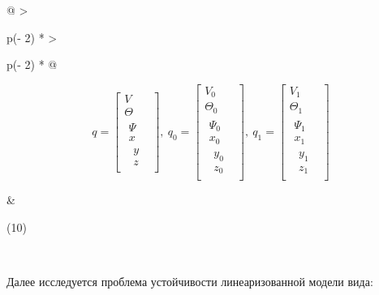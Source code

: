 \begin{longtable}[]{@{}
  >{\raggedright\arraybackslash}p{(\columnwidth - 2\tabcolsep) * }
  >{\raggedright\arraybackslash}p{(\columnwidth - 2\tabcolsep) * }@{}}
\toprule\noalign{}
\begin{minipage}[b]{\linewidth}\raggedright
\[q = \begin{bmatrix}
V \\
\Theta \\
\begin{matrix}
\Psi \\
x \\
\begin{matrix}
y \\
z
\end{matrix}
\end{matrix}
\end{bmatrix},\ q_{0} = \begin{bmatrix}
V_{0} \\
\Theta_{0} \\
\begin{matrix}
\Psi_{0} \\
x_{0} \\
\begin{matrix}
y_{0} \\
z_{0}
\end{matrix}
\end{matrix}
\end{bmatrix},\ q_{1} = \begin{bmatrix}
V_{1} \\
\Theta_{1} \\
\begin{matrix}
\Psi_{1} \\
x_{1} \\
\begin{matrix}
y_{1} \\
z_{1}
\end{matrix}
\end{matrix}
\end{bmatrix}\]
\end{minipage} & \begin{minipage}[b]{\linewidth}\raggedright
(10)
\end{minipage} \\
\midrule\noalign{}
\endhead
\bottomrule\noalign{}
\endlastfoot
\end{longtable}

Далее исследуется проблема устойчивости линеаризованной модели вида:

